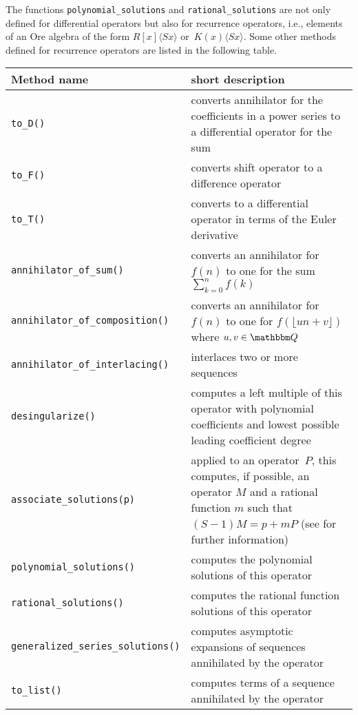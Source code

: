 \documentclass[11pt]{amsart}
\let\set\mathbbm
\def\<#1>{\langle#1\rangle}
\begin{document}
The functions \verb|polynomial_solutions| and \verb|rational_solutions| are not
only defined for differential operators but also for recurrence operators, i.e.,
elements of an Ore algebra of the form $R[x]\<Sx>$ or~$K(x)\<Sx>$. Some other
methods defined for recurrence operators are listed in the following table. 

\begin{center}
  \begin{tabular}{|l|p{.55\hsize}|}
    \hline
    Method name & short description \\\hline
    \verb|to_D()| & converts annihilator for the coefficients in a power series to a
        differential operator for the sum \\
    \verb|to_F()| & converts shift operator to a difference operator\\
    \verb|to_T()| & converts to a differential operator in terms of the Euler derivative \\
    \verb|annihilator_of_sum()| & converts an annihilator for $f(n)$ to one for the sum $\sum_{k=0}^n f(k)$\\
    \verb|annihilator_of_composition()| & converts an annihilator for $f(n)$ to one for $f(\lfloor un+v \rfloor)$ where $u, v \in \set Q$ \\
    \verb|annihilator_of_interlacing()| & interlaces two or more sequences\\
    \verb|desingularize()| & computes a left multiple of this operator with polynomial coefficients and 
           lowest possible leading coefficient degree\\
    \verb|associate_solutions(p)| & applied to an operator~$P$, this computes, if possible, an operator $M$
    and a rational function $m$ such that $(S-1)M=p+mP$ (see \cite{abramov99} for further information)\\
    \verb|polynomial_solutions()| & computes the polynomial solutions of this operator\\
    \verb|rational_solutions()| & computes the rational function solutions of this operator\\
    \verb|generalized_series_solutions()| & computes asymptotic expansions of sequences annihilated by the operator\\ 
    \verb|to_list()| & computes terms of a sequence annihilated by the operator\\\hline
  \end{tabular}
\end{center}

\smallskip
\end{document}
